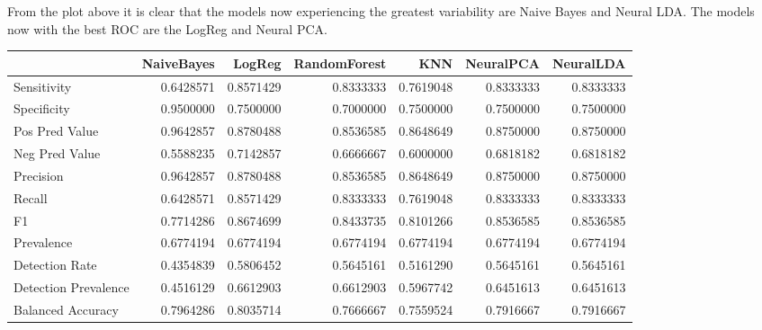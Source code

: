 \documentclass[
]{article}
\newenvironment{Shaded}{\begin{snugshade}}{\end{snugshade}}
\newcommand{\ControlFlowTok}[1]{\textcolor[rgb]{0.13,0.29,0.53}{\textbf{#1}}}
\newcommand{\DataTypeTok}[1]{\textcolor[rgb]{0.13,0.29,0.53}{#1}}
\newcommand{\KeywordTok}[1]{\textcolor[rgb]{0.13,0.29,0.53}{\textbf{#1}}}
\newcommand{\NormalTok}[1]{#1}
\newcommand{\OperatorTok}[1]{\textcolor[rgb]{0.81,0.36,0.00}{\textbf{#1}}}
\newcommand{\StringTok}[1]{\textcolor[rgb]{0.31,0.60,0.02}{#1}}
\begin{document}
From the plot above it is clear that the models now experiencing the
greatest variability are Naive Bayes and Neural LDA. The models now with
the best ROC are the LogReg and Neural PCA.

\begin{Shaded}
\end{Shaded}

\begin{tabular}{l|r|r|r|r|r|r}
\hline
  & NaiveBayes & LogReg & RandomForest & KNN & NeuralPCA & NeuralLDA\\
\hline
Sensitivity & 0.6428571 & 0.8571429 & 0.8333333 & 0.7619048 & 0.8333333 & 0.8333333\\
\hline
Specificity & 0.9500000 & 0.7500000 & 0.7000000 & 0.7500000 & 0.7500000 & 0.7500000\\
\hline
Pos Pred Value & 0.9642857 & 0.8780488 & 0.8536585 & 0.8648649 & 0.8750000 & 0.8750000\\
\hline
Neg Pred Value & 0.5588235 & 0.7142857 & 0.6666667 & 0.6000000 & 0.6818182 & 0.6818182\\
\hline
Precision & 0.9642857 & 0.8780488 & 0.8536585 & 0.8648649 & 0.8750000 & 0.8750000\\
\hline
Recall & 0.6428571 & 0.8571429 & 0.8333333 & 0.7619048 & 0.8333333 & 0.8333333\\
\hline
F1 & 0.7714286 & 0.8674699 & 0.8433735 & 0.8101266 & 0.8536585 & 0.8536585\\
\hline
Prevalence & 0.6774194 & 0.6774194 & 0.6774194 & 0.6774194 & 0.6774194 & 0.6774194\\
\hline
Detection Rate & 0.4354839 & 0.5806452 & 0.5645161 & 0.5161290 & 0.5645161 & 0.5645161\\
\hline
Detection Prevalence & 0.4516129 & 0.6612903 & 0.6612903 & 0.5967742 & 0.6451613 & 0.6451613\\
\hline
Balanced Accuracy & 0.7964286 & 0.8035714 & 0.7666667 & 0.7559524 & 0.7916667 & 0.7916667\\
\hline
\end{tabular}
\end{document}
